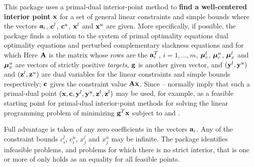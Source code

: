 \documentclass{galahad}
\begin{document}
\galheader


\galsummary
This package uses a primal-dual interior-point method
to {\bf find a well-centered interior point} ${\mathbf{x}}$ for a set of
general linear constraints
and simple bounds
where the vectors 
${\mathbf{a}}_{i}$, ${\mathbf{c}}^{l}$, ${\mathbf{c}}^{u}$, ${\mathbf{x}}^{l}$ and ${\mathbf{x}}^{u}$ are given.
More specifically, if possible, the package finds a solution to the 
system of  primal optimality equations
dual optimality equations
and perturbed complementary slackness equations
and
for which
Here ${\mathbf{A}}$ is the matrix whose rows are the ${\mathbf{a}}_i^T$, $i = 1, \ldots , m$,
$\bm \mu_c^{l}$, $\bm \mu_c^{u}$, $\bm \mu_x^{l}$ and $\bm \mu_x^{u}$ are
vectors of strictly positive {\em targets}, ${\mathbf{g}}$ is another given vector,
and $({\mathbf{y}}^{l}, {\mathbf{y}}^{u})$ and $({\mathbf{z}}^{l}, {\mathbf{z}}^{u})$ are dual variables
for the linear constraints and simple bounds respectively; 
${\mathbf{c}}$ gives the constraint value ${\mathbf{A}} {\mathbf{x}}$.
Since -- normally imply that
such a primal-dual point $({\mathbf{x}}, {\mathbf{c}}, {\mathbf{y}}^{l}, {\mathbf{y}}^{u}, {\mathbf{z}}^{l}, {\mathbf{z}}^{l})$
may be used, for example, as a feasible starting point for primal-dual 
interior-point methods for solving the linear programming problem 
of minimizing ${\mathbf{g}}^T {\mathbf{x}}$ subject to  and .

Full advantage is taken of any zero coefficients in the 
vectors ${\mathbf{a}}_{i}$. 
Any of the constraint bounds $c_{i}^{l}$, $c_{i}^{u}$, 
$x_{j}^{l}$ and $x_{j}^{u}$ may be infinite.
The package identifies infeasible problems, and problems for which there
is no strict interior, that is one or more of 
only holds as an equality for all feasible points.
\end{document}
